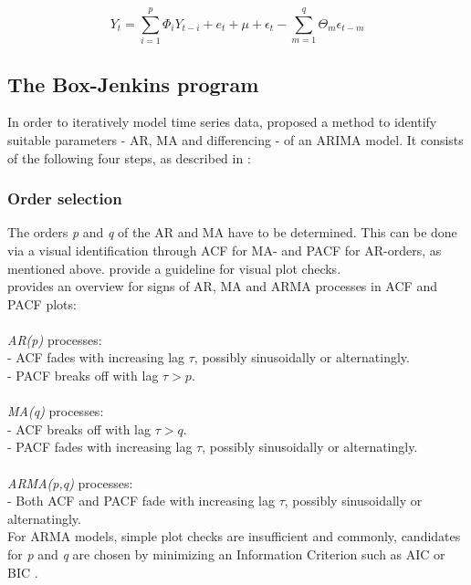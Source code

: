 \documentclass[a4paper, 11pt]{article}
\begin{document}
\begin{equation}
Y_{t} = \sum_{i = 1}^{p}\Phi_{i}Y_{t-i} + e_{t} + \mu + \epsilon_{t} - \sum_{m = 1}^{q} \Theta_{m}\epsilon_{t-m} 
\end{equation}

\subsection{The Box-Jenkins program}
In order to iteratively model time series data, \citep{Box.1976} proposed a method to identify suitable parameters - AR, MA and differencing - of an ARIMA model. It consists of the following four steps, as described in \cite{Falk.2012}: \\
\subsubsection{Order selection}
The orders \textit{p} and \textit{q} of the AR and MA have to be determined. This can be done via a visual identification through ACF for MA- and PACF for AR-orders, as mentioned above. \cite{Andreoni.2006b} provide a guideline for visual plot checks. \\
\cite{Vogel.2015} provides an overview for signs of AR, MA and ARMA processes in ACF and PACF plots: \\
\\
\textit{AR(p)} processes:\\
- ACF fades with increasing lag $\tau$, possibly sinusoidally or alternatingly.\\
- PACF breaks off with lag $\tau > p$.\\
\\
\textit{MA(q)} processes:\\
- ACF breaks off with lag $\tau > q$.\\
- PACF fades with increasing lag $\tau$, possibly sinusoidally or alternatingly.\\
\\
\textit{ARMA(p,q)} processes: \\
- Both ACF and PACF fade with increasing lag $\tau$, possibly sinusoidally or alternatingly.\\

For ARMA models, simple plot checks are insufficient and commonly, candidates for \textit{p} and \textit{q} are chosen by minimizing an Information Criterion such as AIC or BIC \citep{Falk.2012}. \\
\end{document}
